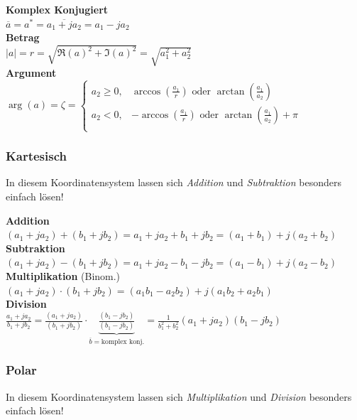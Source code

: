 \noindent\textbf{Komplex Konjugiert}\\
$\overline{a} = a^* = \overline{a_1 + ja_2} = a_1 - ja_2$\\

\noindent\textbf{Betrag}\\
$\left|a\right| = r = \sqrt{\Re(a)^2 + \Im(a)^2} = \sqrt{a_1^2 + a_2^2} $\\

\noindent\textbf{Argument}\\
$\arg(a) = \zeta = \left\{\begin{array}{ll}
	a_2 \geq 0 ,& \arccos\left(\frac{a_1}{r}\right) \text{ oder } \arctan\left(\frac{a_1}{a_2}\right)\\
	a_2 < 0 ,& -\arccos\left(\frac{a_1}{r}\right) \text{ oder } \arctan\left(\frac{a_1}{a_2}\right) + \pi\\
\end{array}\right.$\\


\subsubsection{Kartesisch}
In diesem Koordinatensystem lassen sich \textit{Addition} und \textit{Subtraktion} besonders einfach lösen!

\noindent\textbf{Addition}\\
$(a_1 + ja_2) + (b_1 + jb_2) = a_1 + ja_2 + b_1 + jb_2 = (a_1 + b_1) + j(a_2 + b_2)$\\

\noindent\textbf{Subtraktion}\\
$(a_1 + ja_2) - (b_1 + jb_2) = a_1 + ja_2 - b_1 - jb_2 = (a_1 - b_1) + j(a_2 - b_2)$\\

\noindent\textbf{Multiplikation} (Binom.)\\
$(a_1 + ja_2) \cdot (b_1 + jb_2) = (a_1b_1 - a_2b_2) + j(a_1b_2 + a_2b_1)$\\

\noindent\textbf{Division}\\
$\frac{a_1 + ja_2}{b_1 + jb_2} = \frac{(a_1 + ja_2)}{(b_1 + jb_2)} \cdot \underbrace{\frac{(b_1 - jb_2)}{(b_1 - jb_2)}}_{\overline{b} = \text{komplex konj.}} = \frac{1}{b_1^2 + b_2^2}(a_1+ja_2)(b_1 - jb_2)$\\

\subsubsection{Polar}
In diesem Koordinatensystem lassen sich \textit{Multiplikation} und \textit{Division} besonders einfach lösen!

